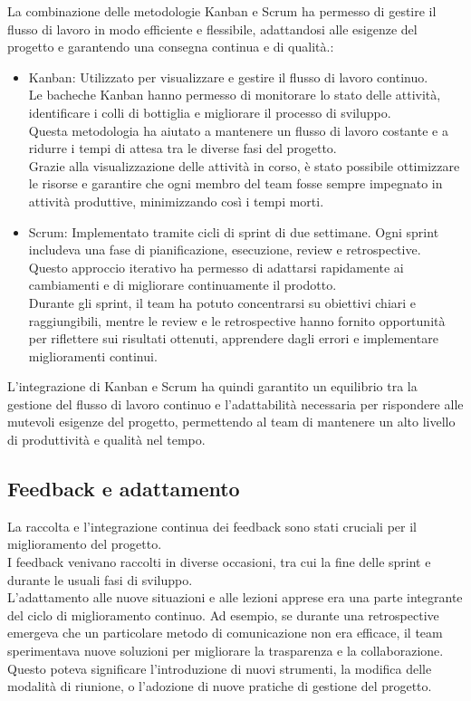 La combinazione delle metodologie Kanban e Scrum ha permesso di gestire il flusso
di lavoro in modo efficiente e flessibile, adattandosi alle esigenze del
progetto e garantendo una consegna continua e di qualità.:
\begin{itemize}
  \item Kanban: Utilizzato per visualizzare e gestire il flusso di lavoro
    continuo.\\ Le bacheche Kanban hanno permesso di monitorare lo stato delle
    attività, identificare i colli di bottiglia e migliorare il processo di sviluppo.\\
    Questa metodologia ha aiutato a mantenere un flusso di lavoro costante e a ridurre
    i tempi di attesa tra le diverse fasi del progetto.\\ Grazie alla visualizzazione
    delle attività in corso, è stato possibile ottimizzare le risorse e
    garantire che ogni membro del team fosse sempre impegnato in attività
    produttive, minimizzando così i tempi morti.

  \item Scrum: Implementato tramite cicli di sprint di due settimane. Ogni sprint
    includeva una fase di pianificazione, esecuzione, review e retrospective.\\ Questo
    approccio iterativo ha permesso di adattarsi rapidamente ai cambiamenti e di
    migliorare continuamente il prodotto.\\ Durante gli sprint, il team ha
    potuto concentrarsi su obiettivi chiari e raggiungibili, mentre le review e le
    retrospective hanno fornito opportunità per riflettere sui risultati ottenuti,
    apprendere dagli errori e implementare miglioramenti continui.
\end{itemize}
L'integrazione di Kanban e Scrum ha quindi garantito un equilibrio tra la
gestione del flusso di lavoro continuo e l'adattabilità necessaria per
rispondere alle mutevoli esigenze del progetto, permettendo al team di mantenere
un alto livello di produttività e qualità nel tempo.

\subsection{Feedback e adattamento}
\label{sub:feedback}

La raccolta e l'integrazione continua dei feedback sono stati cruciali per il
miglioramento del progetto.\\ I feedback venivano raccolti in diverse occasioni,
tra cui la fine delle sprint e durante le usuali fasi di sviluppo.\\ L'adattamento
alle nuove situazioni e alle lezioni apprese era una parte integrante del ciclo di
miglioramento continuo. Ad esempio, se durante una retrospective emergeva che un
particolare metodo di comunicazione non era efficace, il team sperimentava nuove
soluzioni per migliorare la trasparenza e la collaborazione.\\ Questo poteva
significare l'introduzione di nuovi strumenti, la modifica delle modalità di riunione,
o l'adozione di nuove pratiche di gestione del progetto.